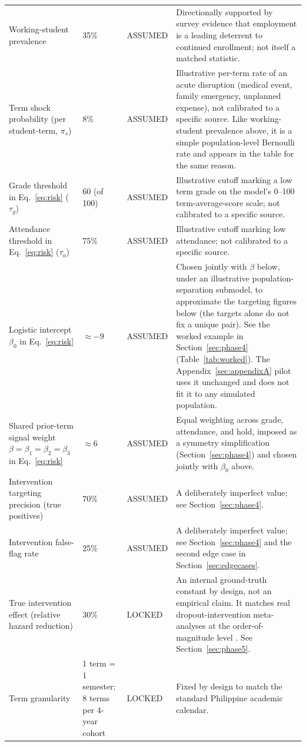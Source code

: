 \documentclass[11pt]{article}
\begin{document}
{\begin{longtable}{@{}p{}p{}p{}p{}@{}}
\addlinespace
Working-student prevalence & 35\% & ASSUMED & Directionally supported by survey evidence that employment is a leading deterrent to continued enrollment; not itself a matched statistic. \\
\addlinespace
Term shock probability (per student-term, $\pi_s$) & 8\% & ASSUMED & Illustrative per-term rate of an acute disruption (medical event, family emergency, unplanned expense), not calibrated to a specific source. Like working-student prevalence above, it is a simple population-level Bernoulli rate and appears in the table for the same reason. \\
\addlinespace
Grade threshold in Eq.~\ref{eq:risk} ($\tau_g$) & 60 (of 100) & ASSUMED & Illustrative cutoff marking a low term grade on the model's 0--100 term-average-score scale; not calibrated to a specific source. \\
\addlinespace
Attendance threshold in Eq.~\ref{eq:risk} ($\tau_a$) & 75\% & ASSUMED & Illustrative cutoff marking low attendance; not calibrated to a specific source. \\
\addlinespace
Logistic intercept $\beta_0$ in Eq.~\ref{eq:risk} & $\approx -9$ & ASSUMED & Chosen jointly with $\beta$ below, under an illustrative population-separation submodel, to approximate the targeting figures below (the targets alone do not fix a unique pair). See the worked example in Section~\ref{sec:phase4} (Table~\ref{tab:worked}). The Appendix~\ref{sec:appendixA} pilot uses it unchanged and does not fit it to any simulated population. \\
\addlinespace
Shared prior-term signal weight $\beta=\beta_1=\beta_2=\beta_3$ in Eq.~\ref{eq:risk} & $\approx 6$ & ASSUMED & Equal weighting across grade, attendance, and hold, imposed as a symmetry simplification (Section~\ref{sec:phase4}) and chosen jointly with $\beta_0$ above. \\
\addlinespace
Intervention targeting precision (true positives) & 70\% & ASSUMED & A deliberately imperfect value; see Section~\ref{sec:phase4}. \\
\addlinespace
Intervention false-flag rate & 25\% & ASSUMED & A deliberately imperfect value; see Section~\ref{sec:phase4} and the second edge case in Section~\ref{sec:edgecases}. \\
\addlinespace
True intervention effect (relative hazard reduction) & 30\% & LOCKED & An internal ground-truth constant by design, not an empirical claim. It matches real dropout-intervention meta-analyses at the order-of-magnitude level \citep{wang2024meta}. See Section~\ref{sec:phase5}. \\
\addlinespace
Term granularity & 1 term = 1 semester; 8 terms per 4-year cohort & LOCKED & Fixed by design to match the standard Philippine academic calendar. \\
\end{longtable}
}
\end{document}
